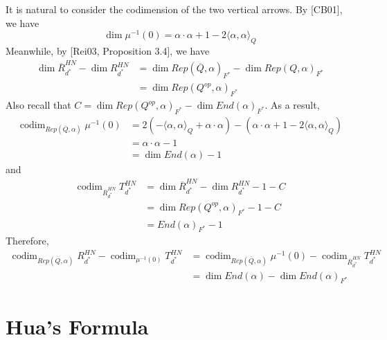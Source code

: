 \documentclass[12pt]{amsart}
\theoremstyle{plain}
\theoremstyle{definition}
\theoremstyle{remark}
\begin{document}
\begin{center}
\end{center}
It is natural to consider the codimension of the two vertical arrows.
By [CB01], we have 
$$\dim \mu^{-1}(0)=\alpha\cdot\alpha+1-2\langle\alpha,\alpha\rangle_{Q}$$
Meanwhile, by [Rei03, Proposition 3.4], we have 
\begin{align*}
\dim \overline{R}_{d^*}^{HN}-\dim R_{d^*}^{HN}&=\dim Rep(\overline{Q},\alpha)_{F^*}-\dim Rep(Q,\alpha)_{F^*}\\
&=\dim Rep(Q^{op},\alpha)_{F^*}
\end{align*}
Also recall that $C=\dim Rep(Q^{op},\alpha)_{F^*}-\dim End(\alpha)_{F^*}$. 
As a result,
\begin{align*}
\operatorname{codim}_{Rep(\overline{Q},\alpha)}\mu^{-1}(0)&=2(-\langle\alpha,\alpha\rangle_{Q}+\alpha\cdot\alpha)-(\alpha\cdot\alpha+1-2\langle\alpha,\alpha\rangle_Q)\\
&=\alpha\cdot\alpha-1\\
&=\dim End(\alpha)-1
\end{align*}
and 
\begin{align*}
\operatorname{codim}_{\overline{R}_{d^*}^{HN}}T_{d^*}^{HN}&=\dim \overline{R}_{d^*}^{HN}-\dim R_{d^*}^{HN}-1-C\\
&=\dim Rep(Q^{op},\alpha)_{F^*}-1-C\\
&=End(\alpha)_{F^*}-1
\end{align*}
Therefore, 
\begin{align*}    \operatorname{codim}_{Rep(\overline{Q},\alpha)}R_{d^*}^{HN}-\operatorname{codim}_{\mu^{-1}(0)}T_{d^*}^{HN}&=\operatorname{codim}_{Rep(\overline{Q},\alpha)}\mu^{-1}(0)-\operatorname{codim}_{\overline{R}_{d^*}^{HN}}T_{d^*}^{HN}\\
    &=\dim End(\alpha)-\dim End(\alpha)_{F^*}
\end{align*}
\section{Hua's Formula}
\end{document}
